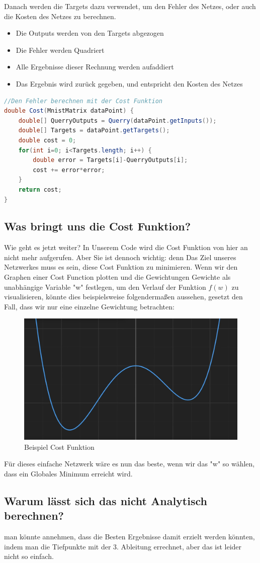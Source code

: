 \documentclass[12pt]{article}
\begin{document}
Danach werden die Targets dazu verwendet, um den Fehler des Netzes, oder auch die Kosten des Netzes zu berechnen. 
\begin{itemize}
\item Die Outputs werden von den Targets abgezogen
\item Die Fehler werden Quadriert
\item Alle Ergebnisse dieser Rechnung werden aufaddiert
\item Das Ergebnis wird zurück gegeben, und entspricht den Kosten des Netzes
\end{itemize}
\begin{lstlisting}[language=Java]
//Den Fehler berechnen mit der Cost Funktion
double Cost(MnistMatrix dataPoint) {
    double[] QuerryOutputs = Querry(dataPoint.getInputs());
    double[] Targets = dataPoint.getTargets();
    double cost = 0;
    for(int i=0; i<Targets.length; i++) {
        double error = Targets[i]-QuerryOutputs[i];
        cost += error*error;
    }
    return cost;
}
\end{lstlisting}\subsection{Was bringt uns die Cost Funktion?}Wie geht es jetzt weiter? In Unserem Code wird die Cost Funktion von hier an nicht mehr aufgerufen. Aber Sie ist dennoch wichtig: denn Das Ziel unseres Netzwerkes muss es sein, diese Cost Funktion zu minimieren. Wenn wir den Graphen einer Cost Function plotten und die Gewichtungen Gewichte als unabhängige Variable "w" festlegen, um den Verlauf der Funktion $f(w)$ zu visualisieren, könnte dies beispielsweise folgendermaßen aussehen, gesetzt den Fall, dass wir nur eine einzelne Gewichtung betrachten:
\begin{figure}[H]
\centering
\includegraphics[scale=0.30]{./Images/Pasted image 20230914193809.png}
\caption{Beispiel Cost Funktion}
\label{Was kommt hier rein?}\end{figure}Für dieses einfache Netzwerk wäre es nun das beste, wenn wir das "w" so wählen, dass ein Globales Minimum erreicht wird. \subsection{Warum lässt sich das nicht Analytisch berechnen?}man könnte annehmen, dass die Besten Ergebnisse damit erzielt werden könnten, indem man die Tiefpunkte mit der 3. Ableitung errechnet, aber das ist leider nicht so einfach.
\end{document}
